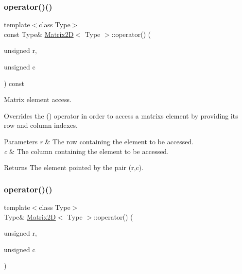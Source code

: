 \subsubsection{\texorpdfstring{operator()()}{operator()()}\hspace{0.1cm}{\footnotesize\ttfamily [1/4]}}
{\footnotesize\ttfamily template$<$class Type$>$ \\
const Type\& \hyperlink{classMatrix2D}{Matrix2D}$<$ Type $>$\+::operator() (\begin{DoxyParamCaption}\item[{unsigned}]{r,  }\item[{unsigned}]{c }\end{DoxyParamCaption}) const\hspace{0.3cm}{\ttfamily [inline]}}



Matrix element access. 

Overrides the \textquotesingle{}()\textquotesingle{} operator in order to access a matrix\textquotesingle{}s element by providing its row and column indexes. 
\begin{DoxyParams}{Parameters}
{\em r} & The row containing the element to be accessed. \\
\hline
{\em c} & The column containing the element to be accessed. \\
\hline
\end{DoxyParams}
\begin{DoxyReturn}{Returns}
The element pointed by the pair (r,c). 
\end{DoxyReturn}
\mbox{\label{classMatrix2D_a448fd38c905dd2879244ac345c76b14e}} 
\subsubsection{\texorpdfstring{operator()()}{operator()()}\hspace{0.1cm}{\footnotesize\ttfamily [2/4]}}
{\footnotesize\ttfamily template$<$class Type$>$ \\
Type\& \hyperlink{classMatrix2D}{Matrix2D}$<$ Type $>$\+::operator() (\begin{DoxyParamCaption}\item[{unsigned}]{r,  }\item[{unsigned}]{c }\end{DoxyParamCaption})\hspace{0.3cm}{\ttfamily [inline]}}



